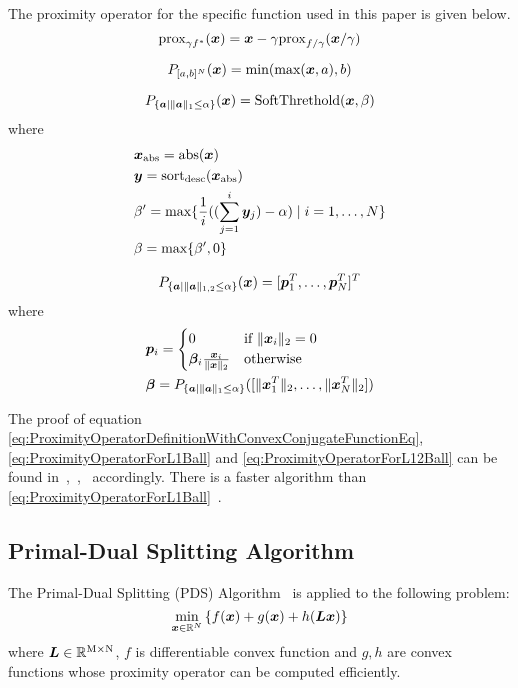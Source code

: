 The proximity operator for the specific function used in this paper is given below.
\begin{equation} \label{eq:ProximityOperatorDefinitionWithConvexConjugateFunctionEq} \proximityOperatorDefinitionWithConvexConjugateFunction \end{equation}

\begin{equation} \label{eq:ProximityOperatorForBoxConstraint} \projBoxSolution \end{equation}

\begin{equation} \label{eq:ProximityOperatorForL1Ball}  \projLOneBallSolution \end{equation}
where
\begin{equation} \label{eq:ProximityOperatorForL1BallWhere} \projLOneBallSolutionWhere \notag \end{equation}

\begin{equation} \label{eq:ProximityOperatorForL12Ball} \projLOneTwoBallSolution \end{equation}
where
\begin{equation} \label{eq:ProximityOperatorForL12BallWhere} \projLOneTwoBallSolutionWhere \notag \end{equation}

The proof of equation \eqref{eq:ProximityOperatorDefinitionWithConvexConjugateFunctionEq}, \eqref{eq:ProximityOperatorForL1Ball} and \eqref{eq:ProximityOperatorForL12Ball} can be found in~\cite[Theorem 3.1 (ii)]{prox-convex-conjugate-function},~\cite{L1-ball-projection},~\cite{L12-ball-projection} accordingly.
There is a faster algorithm than \eqref{eq:ProximityOperatorForL1Ball}~\cite{fast-L1-ball-projection}.

\subsection{Primal-Dual Splitting Algorithm}\label{subsec:primal-dual-splitting-algorithm}
The Primal-Dual Splitting (PDS) Algorithm~\cite{PDS0,PDS1,PDS2,PDS3} is applied to the following problem:
\begin{equation} \label{eq:PDSPrimalEq} \PDSPrimal \end{equation}
where $\bm{L} \in \realNumber^{\intM \times \intN}$, $f$ is differentiable convex function and $g,h$ are convex functions whose proximity operator can be computed efficiently.

